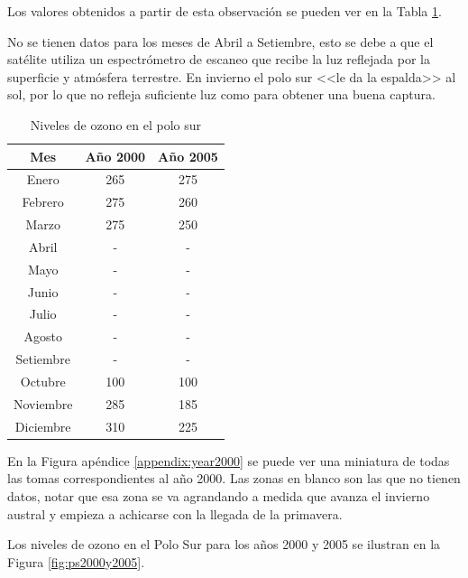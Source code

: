 \documentclass[a4paper]{article}
\begin{document}
Los valores obtenidos a partir de esta observación se pueden ver en la Tabla \ref{table:parte1}.

No se tienen datos para los meses de Abril a Setiembre, esto se debe a que el satélite utiliza un espectrómetro de escaneo que recibe la luz reflejada por la superficie y atmósfera terrestre. En invierno el polo sur <<le da la espalda>> al sol, por lo que no refleja suficiente luz como para obtener una buena captura.

\begin{table}[ht]
\centering
\begin{tabular}{c | c | c}
Mes & Año 2000 & Año 2005 \\\hline
Enero & 265 & 275\\
Febrero & 275 & 260\\
Marzo & 275 & 250 \\
Abril & - & -\\
Mayo & - & -\\
Junio & - & -\\
Julio & - & -\\
Agosto & - & -\\  
Setiembre & - & -\\
Octubre & 100  & 100\\
Noviembre & 285 & 185\\
Diciembre & 310  & 225\\
\end{tabular}
\caption{\label{table:parte1}Niveles de ozono en el polo sur}
\end{table}

En la Figura apéndice \ref{appendix:year2000} se puede ver una miniatura de todas las tomas correspondientes al año 2000. Las zonas en blanco son las que no tienen datos, notar que esa zona se va agrandando a medida que avanza el invierno austral y empieza a achicarse con la llegada de la primavera.

Los niveles de ozono en el Polo Sur para los años 2000 y 2005 se ilustran en la Figura \ref{fig:ps2000y2005}.
\end{document}
